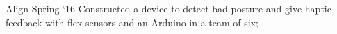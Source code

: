 \project
    {Align}
    {Spring `16}
    {
        Constructed a device to detect bad posture and give haptic feedback with flex sensors and an
        Arduino in a team of six;
    }
